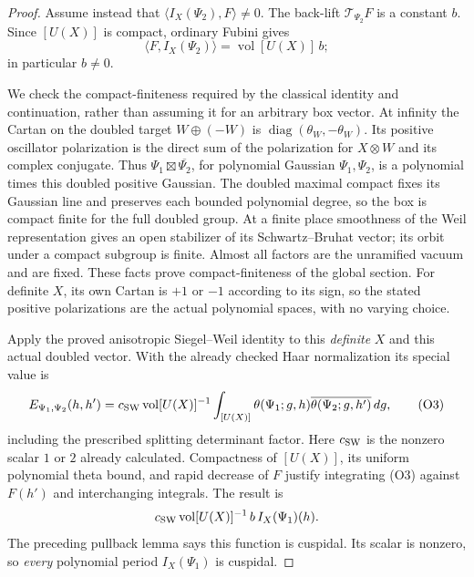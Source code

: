 \begin{proof}
Assume instead that
\(\langle I_X(\Psi_2),F\rangle\ne0\).
The back-lift \(\mathcal T_{\Psi_2}F\) is a constant \(b\).
Since \([U(X)]\) is compact, ordinary Fubini gives
\[
         \langle F,I_X(\Psi_2)\rangle
                      =\operatorname{vol}[U(X)]\,b;
\]
in particular \(b\ne0\).

We check the compact-finiteness required by the classical
identity and continuation, rather than assuming it for an
arbitrary box vector. At infinity the Cartan on the doubled
target \(W\oplus(-W)\) is
\(\operatorname{diag}(\theta_W,-\theta_W)\).
Its positive oscillator polarization is the direct sum of
the polarization for \(X\otimes W\) and its complex conjugate.
Thus \(\Psi_1\boxtimes\overline{\Psi_2}\), for polynomial
Gaussian \(\Psi_1,\Psi_2\), is a polynomial times this doubled
positive Gaussian. The doubled maximal compact fixes its
Gaussian line and preserves each bounded polynomial degree,
so the box is compact finite for the full doubled group.
At a finite place smoothness of the Weil representation
gives an open stabilizer of its Schwartz--Bruhat vector;
its orbit under a compact subgroup is finite.
Almost all factors are the unramified vacuum and are fixed.
These facts prove compact-finiteness of the global section.
For definite \(X\), its own Cartan is \(+1\) or \(-1\)
according to its sign, so the stated positive polarizations
are the actual polynomial spaces, with no varying choice.

Apply the proved anisotropic Siegel--Weil identity to this
\emph{definite} \(X\) and this actual doubled vector.
With the already checked Haar normalization its special value is
\[
 E_{\Psi_1,\Psi_2}(h,h')
   =c_{\rm SW}\operatorname{vol}[U(X)]^{-1}
       \int_{[U(X)]}\theta(\Psi_1;g,h)
                    \overline{\theta(\Psi_2;g,h')}\,dg ,
 \tag{O3}\label{eq:sr-theta-anisotropic-doubled-kernel}
\]
including the prescribed splitting determinant factor.
Here \(c_{\rm SW}\) is the nonzero scalar \(1\) or \(2\)
already calculated. Compactness of \([U(X)]\), its uniform
polynomial theta bound, and rapid decrease of \(F\) justify
integrating (O3) against \(F(h')\) and interchanging integrals.
The result is
\[
    c_{\rm SW}\operatorname{vol}[U(X)]^{-1}\,
                                      b\,I_X(\Psi_1)(h).
\]
The preceding pullback lemma says this function is cuspidal.
Its scalar is nonzero, so \emph{every} polynomial period
\(I_X(\Psi_1)\) is cuspidal.


\end{proof}
